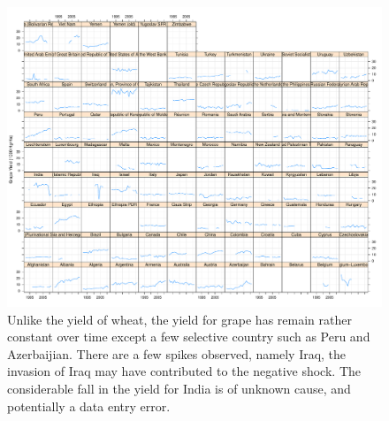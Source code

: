 \documentclass[nojss]{jss}\usepackage[]{graphicx}\usepackage[]{color}
\makeatletter
\def\maxwidth{ %
  \ifdim\Gin@nat@width>\linewidth
    \linewidth
  \else
    \Gin@nat@width
  \fi
}
\newenvironment{knitrout}{}{} %
\makeatother
\begin{document}
\begin{knitrout}
\color{fgcolor}\begin{figure}[!ht]


{\centering \includegraphics[width=\maxwidth]{figure/grape-yield-explore} 

}

\caption[Unlike the yield of wheat, the yield for grape has remain rather constant over time except a few selective country such as Peru and Azerbaijian]{Unlike the yield of wheat, the yield for grape has remain rather constant over time except a few selective country such as Peru and Azerbaijian. There are a few spikes observed, namely Iraq, the invasion of Iraq may have contributed to the negative shock. The considerable fall in the yield for India is of unknown cause, and potentially a data entry error.\label{fig:grape-yield-explore}}
\end{figure}


\end{knitrout}
\end{document}
